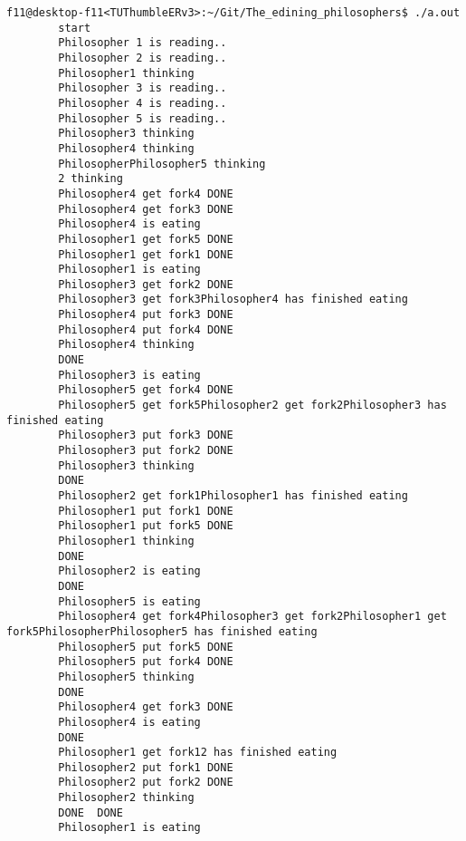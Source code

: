 \documentclass[a4paper,dvipdfmx]{jsarticle}
\begin{document}
    \begin{lstlisting}[caption=実行結果,label=run_res]
        f11@desktop-f11<TUThumbleERv3>:~/Git/The_edining_philosophers$ ./a.out
        start
        Philosopher 1 is reading..
        Philosopher 2 is reading..
        Philosopher1 thinking
        Philosopher 3 is reading..
        Philosopher 4 is reading..
        Philosopher 5 is reading..
        Philosopher3 thinking
        Philosopher4 thinking
        PhilosopherPhilosopher5 thinking
        2 thinking
        Philosopher4 get fork4 DONE 
        Philosopher4 get fork3 DONE 
        Philosopher4 is eating
        Philosopher1 get fork5 DONE 
        Philosopher1 get fork1 DONE 
        Philosopher1 is eating
        Philosopher3 get fork2 DONE 
        Philosopher3 get fork3Philosopher4 has finished eating
        Philosopher4 put fork3 DONE 
        Philosopher4 put fork4 DONE 
        Philosopher4 thinking
        DONE 
        Philosopher3 is eating
        Philosopher5 get fork4 DONE 
        Philosopher5 get fork5Philosopher2 get fork2Philosopher3 has finished eating
        Philosopher3 put fork3 DONE 
        Philosopher3 put fork2 DONE 
        Philosopher3 thinking
        DONE 
        Philosopher2 get fork1Philosopher1 has finished eating
        Philosopher1 put fork1 DONE 
        Philosopher1 put fork5 DONE 
        Philosopher1 thinking
        DONE 
        Philosopher2 is eating
        DONE 
        Philosopher5 is eating
        Philosopher4 get fork4Philosopher3 get fork2Philosopher1 get fork5PhilosopherPhilosopher5 has finished eating
        Philosopher5 put fork5 DONE 
        Philosopher5 put fork4 DONE 
        Philosopher5 thinking
        DONE 
        Philosopher4 get fork3 DONE 
        Philosopher4 is eating
        DONE 
        Philosopher1 get fork12 has finished eating
        Philosopher2 put fork1 DONE 
        Philosopher2 put fork2 DONE 
        Philosopher2 thinking
        DONE  DONE 
        Philosopher1 is eating


\end{lstlisting}
\end{document}
